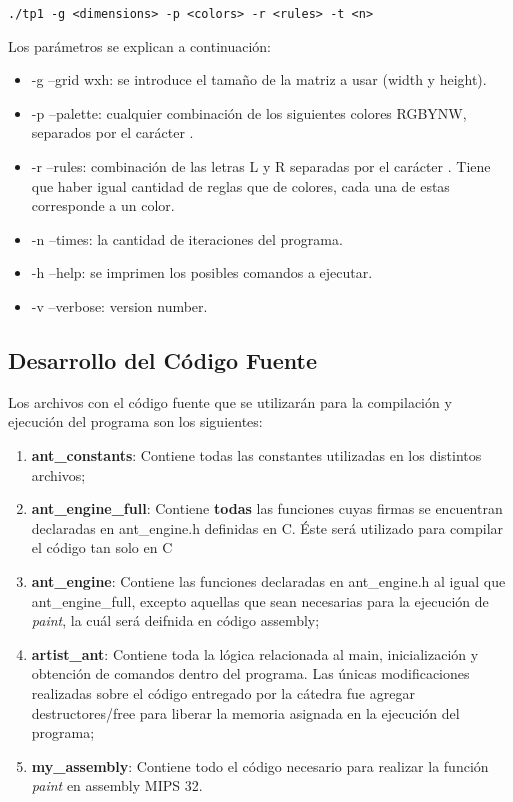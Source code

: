 \documentclass[a4paper, 10pt, twoside, notitlepage]{article}
\begin{document}
\begin{verbatim}
./tp1 -g <dimensions> -p <colors> -r <rules> -t <n>
\end{verbatim}

Los parámetros se explican a continuación:

\begin{itemize}
    \item -g --grid wxh: se introduce el tamaño de la matriz a usar (width y height).
    \item -p --palette: cualquier combinación de los siguientes colores R\textbar\textbar G\textbar\textbar B\textbar\textbar Y\textbar\textbar N\textbar\textbar W, separados por el carácter \textbar\textbar.
    
    \item -r --rules: combinación de las letras L y R separadas por el carácter \textbar\textbar. Tiene que haber igual cantidad de reglas que de colores, cada una de estas corresponde a un color.
    \item -n --times: la cantidad de iteraciones del programa.
    \item -h --help: se imprimen los posibles comandos a ejecutar.
    \item -v --verbose: version number.
\end{itemize}



\newpage
\subsection{Desarrollo del Código Fuente}
Los archivos con el código fuente que se utilizarán para la compilación y ejecución del programa son los siguientes:

\begin{enumerate}
 \item \textbf{ant\_constants}: Contiene todas las constantes utilizadas en los distintos archivos;
 \item \textbf{ant\_engine\_full}: Contiene \textbf{todas} las funciones cuyas firmas se encuentran declaradas en ant\_engine.h definidas en C. Éste será utilizado para compilar el código tan solo en C
 \item \textbf{ant\_engine}: Contiene las funciones declaradas en ant\_engine.h al igual que ant\_engine\_full, excepto aquellas que sean necesarias para la ejecución de \textit{paint}, la cuál será deifnida en código assembly;
 \item \textbf{artist\_ant}: Contiene toda la lógica relacionada al main, inicialización y obtención de comandos dentro del programa. Las únicas modificaciones realizadas sobre el código entregado por la cátedra fue agregar destructores/free para liberar la memoria asignada en la ejecución del programa;
 \item \textbf{my\_assembly}: Contiene todo el código necesario para realizar la función \textit{paint} en assembly MIPS 32.
\end{enumerate}
\end{document}
